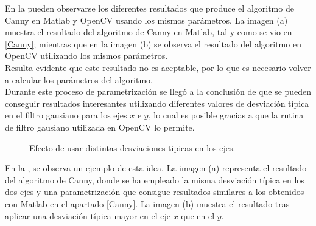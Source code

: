 En la  pueden observarse los diferentes resultados que produce el algoritmo de Canny en Matlab y OpenCV usando los mismos parámetros. La imagen (a) muestra el resultado del algoritmo de Canny en Matlab, tal y como se vio en \ref{Canny}; mientras que en la imagen (b) se observa el resultado del algoritmo en OpenCV utilizando los mismos parámetros.\\


Resulta evidente que este resultado no es aceptable, por lo que es necesario volver a calcular los parámetros del algoritmo.\\

Durante este proceso de parametrización se llegó a la conclusión de que se pueden conseguir resultados interesantes utilizando diferentes valores de desviación típica en el filtro gausiano para los ejes $x$ e $y$, lo cual es posible gracias a que la rutina de filtro gausiano utilizada en OpenCV lo permite.\\


\begin{figure}[!h]
\centering 
{}
\caption{\small{Efecto de usar distintas desviaciones tipicas en los ejes.}} \label{CannyOpenCV2}
\end{figure}

En la , se observa un ejemplo de esta idea. La imagen (a) representa el resultado del algoritmo de Canny, donde se ha empleado la misma desviación típica en los dos ejes y una parametrización que consigue resultados similares a los obtenidos con Matlab en el apartado \ref{Canny}. La imagen (b) muestra el resultado tras aplicar una desviación típica mayor en el eje $x$ que en el $y$. \\

